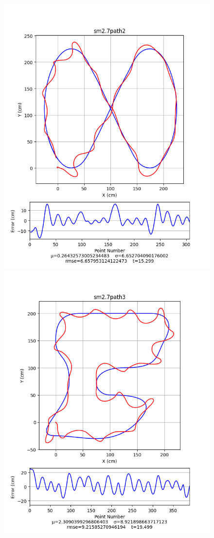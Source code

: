 \documentclass[12pt]{article}
\begin{document}
\begin{flushleft}
\begin{figure}[H]
\includegraphics[width=\linewidth]{images/pathData/smpath2}
\endminipage\\
\includegraphics[width=\linewidth]{images/pathData/smpath3}

\end{figure}
\end{flushleft}
\end{document}
